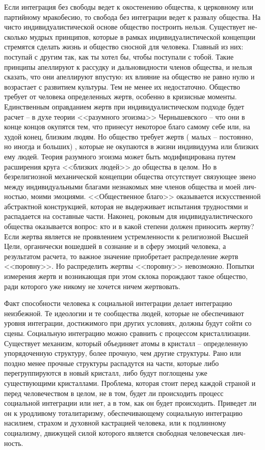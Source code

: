 \documentclass{book}
\begin{document}
Если интеграция без свободы ведет к окостенению общест­ва, к церковному или партийному мракобесию, то свобода без интеграции ведет к развалу общества. На чисто индивидуали­стической основе общество построить нельзя. Существует не­сколько мудрых принципов, которые в рамках индивидуали­стической концепции стремятся сделать жизнь и общество снос­ной для человека. Главный из них: поступай с другим так, как ты хотел бы, чтобы поступали с тобой. Такие принципы апел­лируют к рассудку и дальновидности членов общества, и нель­зя сказать, что они апеллируют впустую: их влияние на общест­во не равно нулю и возрастает с развитием культуры. Тем не менее их недостаточно. Общество требует от человека опре­деленных жертв, особенно в кризисные моменты. Единственным оправданием жертв при индивидуалистическом подходе будет расчет -- в духе теории <<разумного эгоизма>> Чернышевского -- что они в конце концов окупятся тем, что принесут некоторое благо самому себе или, на худой конец, близким людям. Но об­щество требует жертв (
малых -- постоянно, но иногда и боль­ших) , которые не окупаются в жизни индивидуума или близ­ких ему людей. Теория разумного эгоизма может быть моди­фицирована путем расширения круга <<близких людей>> до об­щества в целом. Но в безрелигиозной механической концеп­ции общества отсутствует связующее звено между индивиду­альными благами незнакомых мне членов общества и моей лич­ностью, моими эмоциями. <<Общественное благо>> оказывается искусственной абстрактной конструкцией, которая не выдер­живает испытания трудностями и распадается на составные части. Наконец, роковым для индивидуалистического общест­ва оказывается вопрос: кто и в какой степени должен прино­сить жертву? Если жертва является не проявлением устремлен­ности к религиозной Высшей Цели, органически вошедшей в сознание и в сферу эмоций человека, а результатом расчета, то важное значение приобретает распределение жертв <<поров­ну>>. Но распределить жертвы <<поровну>> невозможно. Попыт­ки измерения жертв и возникающая при этом склока порож­дают такое общество,
 ради которого уже никому не хочется ничем жертвовать.

Факт способности человека к социальной интеграции делает интеграцию неизбежной. Те идеологии и те сообщества людей, которые не обеспечивают уровня интеграции, достижимого при других условиях, должны будут сойти со сцены. Социаль­ную интеграцию можно сравнить с процессом кристаллизации. Существует механизм, который объединяет атомы в кристалл -- определенную упорядоченную структуру, более прочную, чем другие структуры. Рано или поздно менее прочные структуры распадутся на части, которые либо перегруппируются в новый кристалл, либо будут поглощены уже существующими крис­таллами. Проблема, которая стоит перед каждой страной и перед человечеством в целом, не в том, будет ли происходить про­цесс социальной интеграции или нет, а в том, как  он будет про­исходить. Приведет ли он к уродливому тоталитаризму, обеспечивающему социальную интеграцию насилием, страхом и духов­ной кастрацией человека, или к подлинному социализму, дви­жущей силой которого является свободная человеческая лич­ность.
\end{document}

